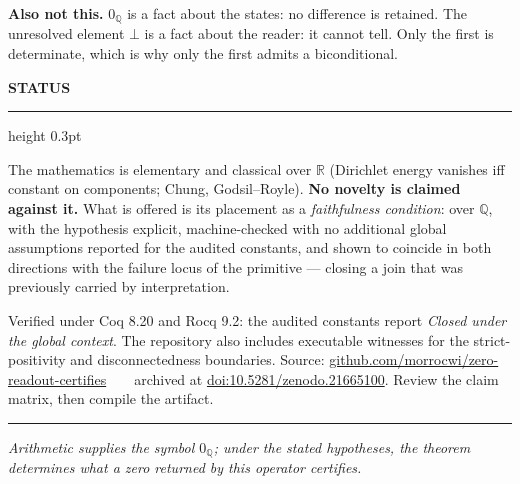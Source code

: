 \documentclass[10pt]{article}
\newcommand{\zQ}{0_{\mathbb{Q}}}
\newcommand{\hd}[1]{\par\vspace{0.10em}\noindent
  {\color{acc}\scriptsize\bfseries\MakeUppercase{#1}}\hspace{0.55em}%
  {\color{acc}\leaders\hrule height 0.3pt\hfill\kern0pt}\par\vspace{0.02em}}
\begin{document}
\textbf{Also not this.} $\zQ$ is a fact about the states: no difference is retained. The unresolved element $\bot$ is a fact about the reader: it cannot tell. Only the first is determinate, which is why only the first admits a biconditional.

\hd{status}

{\scriptsize
The mathematics is elementary and classical over $\mathbb{R}$ (Dirichlet energy vanishes iff constant on components; Chung, Godsil--Royle). \textbf{No novelty is claimed against it.} What is offered is its placement as a \emph{faithfulness condition}: over $\mathbb{Q}$, with the hypothesis explicit, machine-checked with no additional global assumptions reported for the audited constants, and shown to coincide in both directions with the failure locus of the primitive --- closing a join that was previously carried by interpretation.

\vspace{0.3em}
Verified under Coq 8.20 and Rocq 9.2: the audited constants report \emph{Closed under the global context}. The repository also includes executable witnesses for the strict-positivity and disconnectedness boundaries. Source: \href{https://github.com/morrocwi/zero-readout-certifies}{github.com/morrocwi/zero-readout-certifies}\ \ \textbullet\ \ archived at \href{https://doi.org/10.5281/zenodo.21665100}{doi:10.5281/zenodo.21665100}. Review the claim matrix, then compile the artifact.
}

\vspace{0.15em}
{\color{ink}\rule{\linewidth}{0.4pt}}
\vspace{0.05em}
{\color{mut}\scriptsize\itshape Arithmetic supplies the symbol $\zQ$; under the stated hypotheses, the theorem determines what a zero returned by this operator certifies.}
\end{document}
